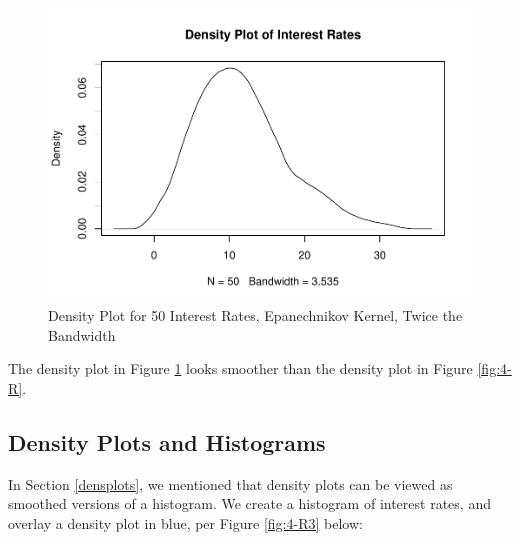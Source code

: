 \documentclass[
]{book}
\newenvironment{Shaded}{\begin{snugshade}}{\end{snugshade}}
\newcommand{\AttributeTok}[1]{\textcolor[rgb]{0.13,0.29,0.53}{#1}}
\newcommand{\ConstantTok}[1]{\textcolor[rgb]{0.56,0.35,0.01}{#1}}
\newcommand{\DocumentationTok}[1]{\textcolor[rgb]{0.56,0.35,0.01}{\textbf{\textit{#1}}}}
\newcommand{\FunctionTok}[1]{\textcolor[rgb]{0.13,0.29,0.53}{\textbf{#1}}}
\newcommand{\NormalTok}[1]{#1}
\newcommand{\SpecialCharTok}[1]{\textcolor[rgb]{0.81,0.36,0.00}{\textbf{#1}}}
\newcommand{\StringTok}[1]{\textcolor[rgb]{0.31,0.60,0.02}{#1}}
\begin{document}
\begin{figure}
\centering
\includegraphics{bookdown-demo_files/figure-latex/4-R2-1.pdf}
\caption{\label{fig:4-R2}Density Plot for 50 Interest Rates, Epanechnikov Kernel, Twice the Bandwidth}
\end{figure}

The density plot in Figure \ref{fig:4-R2} looks smoother than the density plot in Figure \ref{fig:4-R}.

\subsection{Density Plots and Histograms}\label{density-plots-and-histograms}

In Section \ref{densplots}, we mentioned that density plots can be viewed as smoothed versions of a histogram. We create a histogram of interest rates, and overlay a density plot in blue, per Figure \ref{fig:4-R3} below:

\begin{Shaded}
\end{Shaded}
\end{document}
